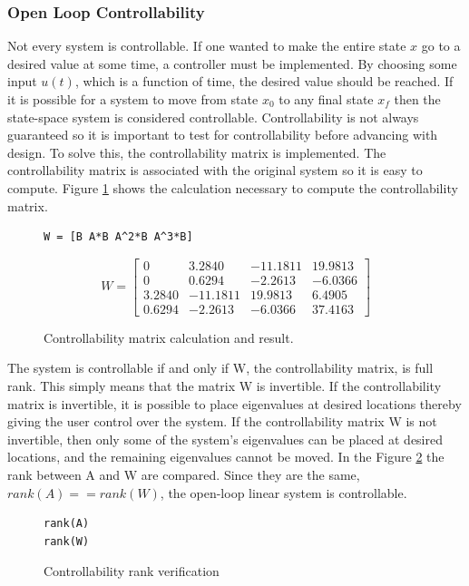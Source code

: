 \documentclass[12pt]{article}
\begin{document}
\subsubsection{Open Loop Controllability}
Not every system is controllable. If one wanted to make the entire state $x$ go to a desired value at some time, a controller must be implemented. By choosing some input $u(t)$, which is a function of time, the desired value should be reached. If it is possible for a system to move from state $x_{0}$ to any final state $x_{f}$ then the state-space system is considered controllable. Controllability is not always guaranteed so it is important to test for controllability before advancing with design. To solve this, the controllability matrix is implemented. The controllability matrix is associated with the original system so it is easy to compute. Figure \ref{controlmat} shows the calculation necessary to compute the controllability matrix.
\begin{figure}[h!]
\begin{lstlisting}
W = [B A*B A^2*B A^3*B]
\end{lstlisting} 
\vspace{5}
\begin{equation*} 
W = \begin{bmatrix}0 & 3.2840 & -11.1811 & 19.9813 \\ 
         0 & 0.6294 & -2.2613 & -6.0366 \\
    3.2840 & -11.1811 & 19.9813 & 6.4905 \\
    0.6294 & -2.2613 & -6.0366 & 37.4163
    \end{bmatrix}
\end{equation*}
\caption{Controllability matrix calculation and result.}
\label{controlmat}
\end{figure}
The system is controllable if and only if W, the controllability matrix, is full rank. This simply means that the matrix W is invertible. If the controllability matrix is invertible, it is possible to place eigenvalues at desired locations thereby giving the user control over the system. If the controllability matrix W is not invertible, then only some of the system's eigenvalues can be placed at desired locations, and the remaining eigenvalues cannot be moved. In the Figure \ref{rank} the rank between A and W are compared. Since they are the same, $rank(A)==rank(W)$, the open-loop linear system is controllable.
\begin{figure}[h!]
\label{rank}
\begin{lstlisting}
rank(A)
rank(W)
\end{lstlisting}
\caption{Controllability rank verification}
\end{figure}
\end{document}
